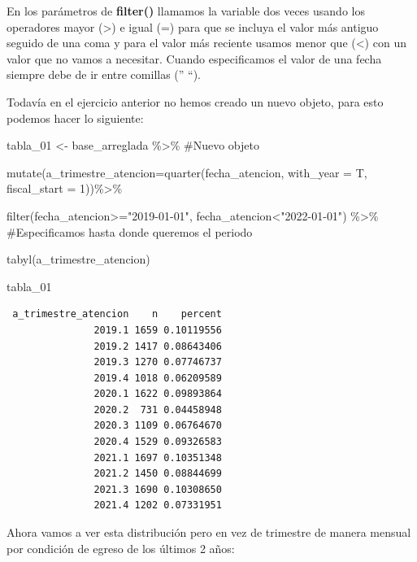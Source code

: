 \documentclass[
  letterpaper,
  DIV=11,
  numbers=noendperiod]{scrreprt}
\newenvironment{Shaded}{\begin{snugshade}}{\end{snugshade}}
\newcommand{\AttributeTok}[1]{\textcolor[rgb]{0.40,0.45,0.13}{#1}}
\newcommand{\CommentTok}[1]{\textcolor[rgb]{0.37,0.37,0.37}{#1}}
\newcommand{\DecValTok}[1]{\textcolor[rgb]{0.68,0.00,0.00}{#1}}
\newcommand{\FunctionTok}[1]{\textcolor[rgb]{0.28,0.35,0.67}{#1}}
\newcommand{\NormalTok}[1]{\textcolor[rgb]{0.00,0.23,0.31}{#1}}
\newcommand{\OtherTok}[1]{\textcolor[rgb]{0.00,0.23,0.31}{#1}}
\newcommand{\SpecialCharTok}[1]{\textcolor[rgb]{0.37,0.37,0.37}{#1}}
\newcommand{\StringTok}[1]{\textcolor[rgb]{0.13,0.47,0.30}{#1}}
\begin{document}
En los parámetros de \textbf{filter()} llamamos la variable dos veces
usando los operadores mayor (\textgreater) e igual (=) para que se
incluya el valor más antiguo seguido de una coma y para el valor más
reciente usamos menor que (\textless) con un valor que no vamos a
necesitar. Cuando especificamos el valor de una fecha siempre debe de ir
entre comillas ('' ``).

Todavía en el ejercicio anterior no hemos creado un nuevo objeto, para
esto podemos hacer lo siguiente:

\begin{Shaded}
\begin{Highlighting}[]
\NormalTok{tabla\_01 }\OtherTok{\textless{}{-}}\NormalTok{ base\_arreglada }\SpecialCharTok{\%\textgreater{}\%}  \CommentTok{\#Nuevo objeto}
  
   \FunctionTok{mutate}\NormalTok{(}\AttributeTok{a\_trimestre\_atencion=}\FunctionTok{quarter}\NormalTok{(fecha\_atencion, }\AttributeTok{with\_year =}\NormalTok{ T, }\AttributeTok{fiscal\_start =} \DecValTok{1}\NormalTok{))}\SpecialCharTok{\%\textgreater{}\%} 
 
   \FunctionTok{filter}\NormalTok{(fecha\_atencion}\SpecialCharTok{\textgreater{}=}\StringTok{"2019{-}01{-}01"}\NormalTok{, fecha\_atencion}\SpecialCharTok{\textless{}}\StringTok{"2022{-}01{-}01"}\NormalTok{) }\SpecialCharTok{\%\textgreater{}\%}  \CommentTok{\#Especificamos hasta donde queremos el periodo }
  
   \FunctionTok{tabyl}\NormalTok{(a\_trimestre\_atencion)}

\NormalTok{tabla\_01}
\end{Highlighting}
\end{Shaded}

\begin{verbatim}
 a_trimestre_atencion    n    percent
               2019.1 1659 0.10119556
               2019.2 1417 0.08643406
               2019.3 1270 0.07746737
               2019.4 1018 0.06209589
               2020.1 1622 0.09893864
               2020.2  731 0.04458948
               2020.3 1109 0.06764670
               2020.4 1529 0.09326583
               2021.1 1697 0.10351348
               2021.2 1450 0.08844699
               2021.3 1690 0.10308650
               2021.4 1202 0.07331951
\end{verbatim}

Ahora vamos a ver esta distribución pero en vez de trimestre de manera
mensual por condición de egreso de los últimos 2 años:
\end{document}
